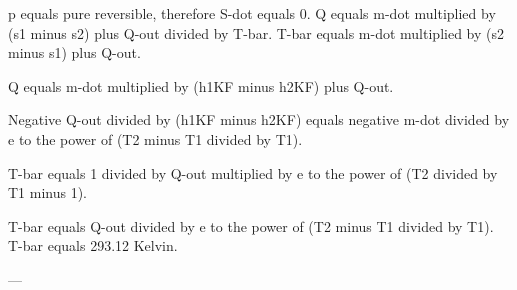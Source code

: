 p equals pure reversible, therefore S-dot equals 0.  
Q equals m-dot multiplied by (s1 minus s2) plus Q-out divided by T-bar.  
T-bar equals m-dot multiplied by (s2 minus s1) plus Q-out.  

Q equals m-dot multiplied by (h1KF minus h2KF) plus Q-out.  

Negative Q-out divided by (h1KF minus h2KF) equals negative m-dot divided by e to the power of (T2 minus T1 divided by T1).  

T-bar equals 1 divided by Q-out multiplied by e to the power of (T2 divided by T1 minus 1).  

T-bar equals Q-out divided by e to the power of (T2 minus T1 divided by T1).  
T-bar equals 293.12 Kelvin.  

---